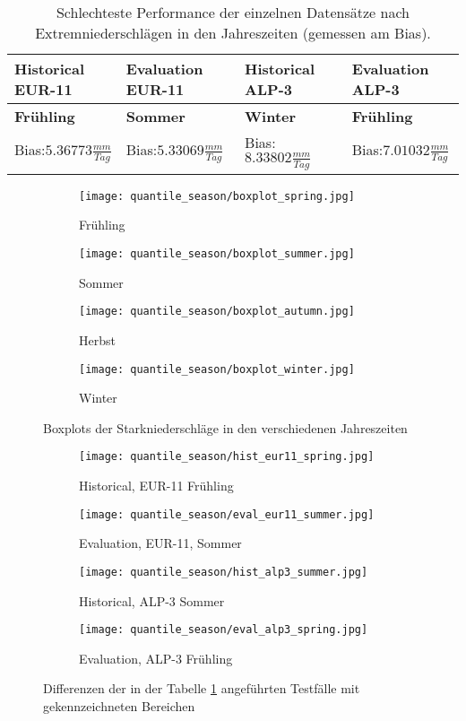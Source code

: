\begin{table}[h]
	\begin{tabularx}{\textwidth}{|X|X|X|X|}
		\hline
		\textbf{Historical EUR-11} & \textbf{Evaluation EUR-11}& \textbf{Historical ALP-3} & \textbf{Evaluation ALP-3}\\
		\hline
		\textbf{Frühling}  & \textbf{Sommer}  & \textbf{Winter} & \textbf{Frühling} \\
		Bias:$5.36773\frac{mm}{Tag}$& Bias:$5.33069\frac{mm}{Tag}$ & Bias:$8.33802\frac{mm}{Tag}$ & Bias:$7.01032\frac{mm}{Tag}$\\
		\hline
	\end{tabularx}
	\caption{Schlechteste Performance der einzelnen Datensätze nach Extremniederschlägen in den Jahreszeiten (gemessen am Bias).}
	\label{tab:season_dataset}
\end{table}
\begin{figure}
	\begin{subfigure}{0.49\textwidth}
		\texttt{[image: quantile\_season/boxplot\_spring.jpg]}
		\caption{Frühling}
	\end{subfigure}
	\begin{subfigure}{0.49\textwidth}
		\texttt{[image: quantile\_season/boxplot\_summer.jpg]}
		\caption{Sommer}
	\end{subfigure}
	\begin{subfigure}{0.49\textwidth}
		\texttt{[image: quantile\_season/boxplot\_autumn.jpg]}
		\caption{Herbst}
	\end{subfigure}
	\begin{subfigure}{0.49\textwidth}
		\texttt{[image: quantile\_season/boxplot\_winter.jpg]}
		\caption{Winter}
	\end{subfigure}
	\caption{Boxplots der Starkniederschläge in den verschiedenen Jahreszeiten}
	\label{fig:seasons_boxplots}
\end{figure}
\begin{figure}
	\begin{subfigure}{0.49\textwidth}
		\texttt{[image: quantile\_season/hist\_eur11\_spring.jpg]}
		\caption{Historical, EUR-11 Frühling}
		\label{fig:seasons_dif:hist_eur11}
	\end{subfigure}
	\begin{subfigure}{0.49\textwidth}
		\texttt{[image: quantile\_season/eval\_eur11\_summer.jpg]}
		\caption{Evaluation, EUR-11, Sommer}
		\label{fig:seasons_dif:eval_eur_11}
	\end{subfigure}
	\begin{subfigure}{0.49\textwidth}
		\texttt{[image: quantile\_season/hist\_alp3\_summer.jpg]}
		\caption{Historical, ALP-3 Sommer}
		\label{fig:seasons_dif:hist_alp3}
	\end{subfigure}
	\begin{subfigure}{0.49\textwidth}
		\texttt{[image: quantile\_season/eval\_alp3\_spring.jpg]}
		\caption{Evaluation, ALP-3 Frühling}
	\end{subfigure}
	\caption{Differenzen der in der Tabelle \ref{tab:season_dataset} angeführten Testfälle mit gekennzeichneten Bereichen}
	\label{fig:seasons_dif}
\end{figure} \newpage
